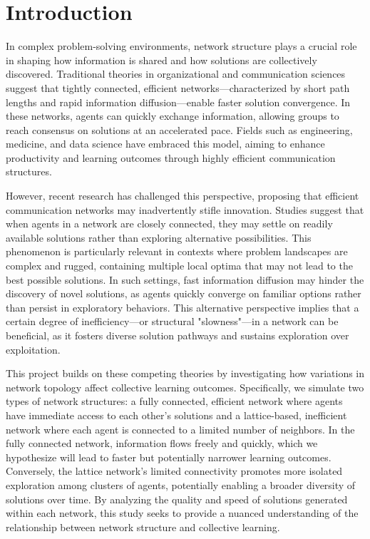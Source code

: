 \documentclass[conference]{IEEEtran}
\begin{document}
\section{Introduction}
In complex problem-solving environments, network structure plays a crucial role in shaping how information is shared and how solutions are collectively discovered. Traditional theories in organizational and communication sciences suggest that tightly connected, efficient networks—characterized by short path lengths and rapid information diffusion—enable faster solution convergence. In these networks, agents can quickly exchange information, allowing groups to reach consensus on solutions at an accelerated pace. Fields such as engineering, medicine, and data science have embraced this model, aiming to enhance productivity and learning outcomes through highly efficient communication structures.

However, recent research has challenged this perspective, proposing that efficient communication networks may inadvertently stifle innovation. Studies suggest that when agents in a network are closely connected, they may settle on readily available solutions rather than exploring alternative possibilities. This phenomenon is particularly relevant in contexts where problem landscapes are complex and rugged, containing multiple local optima that may not lead to the best possible solutions. In such settings, fast information diffusion may hinder the discovery of novel solutions, as agents quickly converge on familiar options rather than persist in exploratory behaviors. This alternative perspective implies that a certain degree of inefficiency—or structural "slowness"—in a network can be beneficial, as it fosters diverse solution pathways and sustains exploration over exploitation.

This project builds on these competing theories by investigating how variations in network topology affect collective learning outcomes. Specifically, we simulate two types of network structures: a fully connected, efficient network where agents have immediate access to each other's solutions and a lattice-based, inefficient network where each agent is connected to a limited number of neighbors. In the fully connected network, information flows freely and quickly, which we hypothesize will lead to faster but potentially narrower learning outcomes. Conversely, the lattice network’s limited connectivity promotes more isolated exploration among clusters of agents, potentially enabling a broader diversity of solutions over time. By analyzing the quality and speed of solutions generated within each network, this study seeks to provide a nuanced understanding of the relationship between network structure and collective learning.
\end{document}
